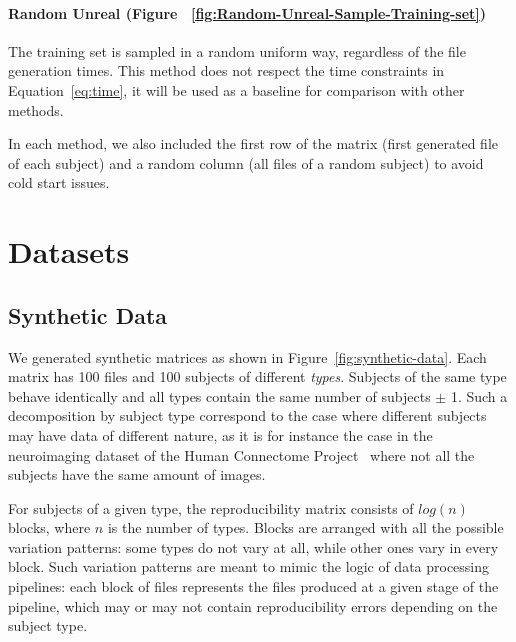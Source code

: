 \documentclass[10pt, conference, compsocconf]{IEEEtran}
\begin{document}
\paragraph{Random Unreal (Figure 
~\ref{fig:Random-Unreal-Sample-Training-set})} The training set is 
sampled in a random uniform way, regardless of the file generation 
times. This method does not respect the time constraints in 
Equation~\ref{eq:time}, it will be used as a baseline for comparison 
with other methods.

In each method, we also included the first row of the matrix (first 
generated file of each subject) and a random column (all files of a 
random subject) to avoid cold start issues. 


\section{Datasets}

\label{sec:datasets}

\subsection{Synthetic Data}

We generated synthetic matrices as shown in 
Figure~\ref{fig:synthetic-data}. Each matrix has 100 files and 100 
subjects of different \emph{types}. Subjects of the same type behave 
identically and all types contain the same number of subjects $\pm$ 1. 
Such a decomposition by subject type correspond to the case where 
different subjects may have data of different nature, as it is for 
instance the case in the neuroimaging 
dataset of the Human Connectome Project~\cite{van2013wu} where not all the 
subjects have the same amount of images.

 For subjects of a given type, the reproducibility matrix consists of 
 $log(n)$  blocks, where $n$ is the number of types. Blocks are 
 arranged with all the possible variation patterns: some types do not 
 vary at all, while other ones vary in every block. Such variation 
 patterns are meant to mimic the logic of data 
processing pipelines: each block of files represents the files produced 
at a given stage of the pipeline, which may or may not contain 
reproducibility errors depending on the subject type.
\end{document}
